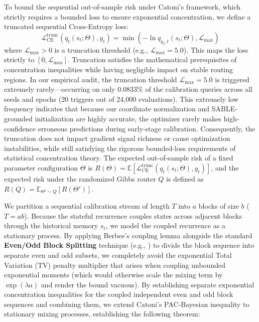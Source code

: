 To bound the sequential out-of-sample risk under Catoni's framework, which strictly requires a bounded loss to ensure exponential concentration, we define a truncated sequential Cross-Entropy loss:
\begin{equation}
    \mathcal{L}_{\text{CE}}^{\text{trunc}}(q_t(s_t; \Theta), y_t) = \min\left(-\ln q_{y_t, t}(s_t; \Theta), \mathcal{L}_{\max}\right)
\end{equation}
where $\mathcal{L}_{\max} > 0$ is a truncation threshold (e.g., $\mathcal{L}_{\max} = 5.0$). This maps the loss strictly to $[0, \mathcal{L}_{\max}]$. Truncation satisfies the mathematical prerequisites of concentration inequalities while having negligible impact on stable routing regions. In our empirical audit, the truncation threshold $\mathcal{L}_{\max} = 5.0$ is triggered extremely rarely—occurring on only $0.0833\%$ of the calibration queries across all seeds and epochs (20 triggers out of 24,000 evaluations). This extremely low frequency indicates that because our coordinate normalization and SABLE-grounded initialization are highly accurate, the optimizer rarely makes high-confidence erroneous predictions during early-stage calibration. Consequently, the truncation does not impact gradient signal richness or cause optimization instabilities, while still satisfying the rigorous bounded-loss requirements of statistical concentration theory. The expected out-of-sample risk of a fixed parameter configuration $\Theta$ is $R(\Theta) = \mathbb{E}[\mathcal{L}_{\text{CE}}^{\text{trunc}}(q_t(s_t; \Theta), y_t)]$, and the expected risk under the randomized Gibbs router $Q$ is defined as $R(Q) = \mathbb{E}_{\Theta' \sim Q}[R(\Theta')]$.

We partition a sequential calibration stream of length $T$ into $a$ blocks of size $b$ ($T = ab$). Because the stateful recurrence couples states across adjacent blocks through the historical memory $s_t$, we model the coupled recurrence as a stationary process. By applying Berbee's coupling lemma alongside the standard \textbf{Even/Odd Block Splitting} technique (e.g., \cite{alquier2013pac}) to divide the block sequence into separate even and odd subsets, we completely avoid the exponential Total Variation (TV) penalty multiplier that arises when coupling unbounded exponential moments (which would otherwise scale the mixing term by $\exp(\lambda a)$ and render the bound vacuous). By establishing separate exponential concentration inequalities for the coupled independent even and odd block sequences and combining them, we extend Catoni's PAC-Bayesian inequality to stationary mixing processes, establishing the following theorem:

